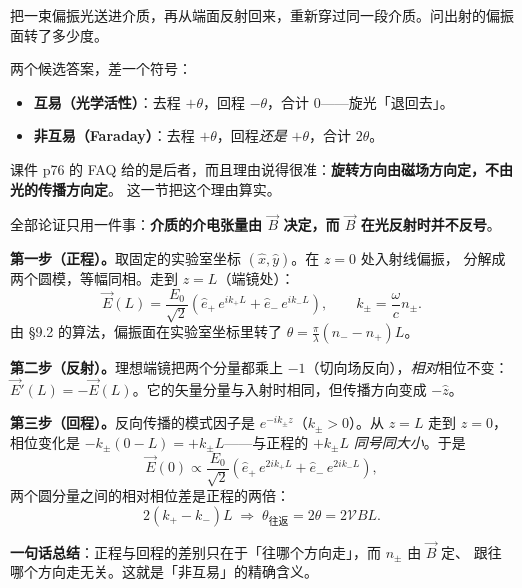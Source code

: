\documentclass[11pt]{ctexart}
\let\subhdrtheme\subhdr
\renewcommand{\subhdr}[1]{\needspace{3\baselineskip}\subhdrtheme{#1}}
\let\hdrorig\hdr
\renewcommand{\hdr}[2]{\needspace{8\baselineskip}\hdrorig{#1}{#2}}
\newcommand{\vdt}{\mathcal{V}}
\begin{document}


把一束偏振光送进介质，再从端面反射回来，重新穿过同一段介质。问出射的偏振面转了多少度。

两个候选答案，差一个符号：
\begin{itemize}
\item \textbf{互易（光学活性）}：去程 $+\theta$，回程 $-\theta$，合计 $0$——旋光「退回去」。
\item \textbf{非互易（Faraday）}：去程 $+\theta$，回程\emph{还是} $+\theta$，合计 $2\theta$。
\end{itemize}

课件 p76 的 FAQ 给的是后者，而且理由说得很准：\textbf{旋转方向由磁场方向定，不由光的传播方向定}。
这一节把这个理由算实。


全部论证只用一件事：\textbf{介质的介电张量由 $\vec B$ 决定，而 $\vec B$ 在光反射时并不反号}。

\textbf{第一步（正程）。}取固定的实验室坐标 $(\hat x,\hat y)$。在 $z=0$ 处入射线偏振，
分解成两个圆模，等幅同相。走到 $z=L$（端镜处）：
\begin{equation}
\vec E(L)=\frac{E_0}{\sqrt2}\left(\hat e_+\,e^{ik_+L}+\hat e_-\,e^{ik_-L}\right),
\qquad k_\pm=\frac{\omega}{c}n_\pm .
\end{equation}
由 §9.2 的算法，偏振面在实验室坐标里转了 $\theta=\frac{\pi}{\lambda}(n_- - n_+)L$。

\textbf{第二步（反射）。}理想端镜把两个分量都乘上 $-1$（切向场反向），\emph{相对}相位不变：
$\vec E'(L)=-\vec E(L)$。它的矢量分量与入射时相同，但传播方向变成 $-\hat z$。

\textbf{第三步（回程）。}反向传播的模式因子是 $e^{-ik_\pm z}$（$k_\pm>0$）。从 $z=L$ 走到 $z=0$，
相位变化是 $-k_\pm(0-L)=+k_\pm L$——与正程的 $+k_\pm L$ \emph{同号同大小}。于是
\begin{equation}
\vec E(0)\propto\frac{E_0}{\sqrt2}\left(\hat e_+\,e^{2ik_+L}+\hat e_-\,e^{2ik_-L}\right),
\end{equation}
两个圆分量之间的相对相位差是正程的两倍：
\begin{equation}
2(k_+-k_-)L \;\Longrightarrow\; \theta_{\text{往返}}=2\theta=2\vdt BL .
\end{equation}


\textbf{一句话总结}：正程与回程的差别只在于「往哪个方向走」，而 $n_\pm$ 由 $\vec B$ 定、
跟往哪个方向走无关。这就是「非互易」的精确含义。
\end{document}
